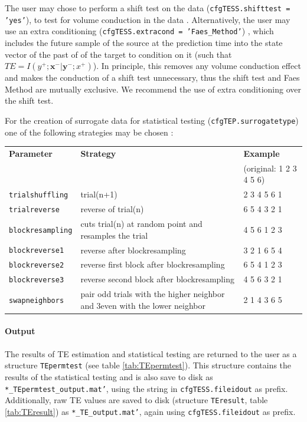 \documentclass[a4paper,10pt]{article}
\begin{document}
The user may chose to perform a shift test on the data (\texttt{cfgTESS.shifttest = 'yes'}), to test for volume conduction in the data \cite{lindner2011}. Alternatively, the user may use an extra conditioning (\texttt{cfgTESS.extracond = 'Faes\_Method'}) \cite{faes2013}, which includes the future sample of the source at the prediction time into the state vector of the past of of the target to condition on it (such that $TE = I\left(y^+;\mathbf{x}^-|\mathbf{y}^-; x^+\right)$). In principle, this removes any volume conduction effect and makes the conduction of a shift test unnecessary, thus the shift test and Faes Method are mutually exclusive. We recommend the use of extra conditioning over the shift test.

For the creation of surrogate data for statistical testing (\verb+cfgTEP.surrogatetype+) one of the following strategies may be chosen \cite{lindner2011}:

\begin{table}[H]
\begin{tabularx}{\textwidth}{lL{5cm}X} \toprule
\textbf{Parameter} & \textbf{Strategy} & \textbf{Example} \\
		   & 		       & (original: 1 2 3 4 5 6) \\ \midrule
\texttt{trialshuffling} &  trial(n+1) & 2 3 4 5 6 1 \\
\texttt{trialreverse}   &  reverse of trial(n) & 6 5 4 3 2 1 \\
\texttt{blockresampling} & cuts trial(n) at random point and resamples the trial &4 5 6 1 2 3 \\
\texttt{blockreverse1}   & reverse after blockresampling & 3 2 1 6 5 4 \\
\texttt{blockreverse2}   & reverse first block after blockresampling & 6 5 4 1 2 3\\
\texttt{blockreverse3}   & reverse second block after blockresampling & 4 5 6 3 2 1 \\
\texttt{swapneighbors}   & pair odd trials with the higher neighbor and 3even with the lower neighbor & 2 1 4 3 6 5\\ \bottomrule
\end{tabularx} \label{tab:surrogatetype}
\end{table}


\paragraph*{Output} The results of TE estimation and statistical testing are returned to the user as a structure \texttt{TEpermtest} (see table \ref{tab:TEpermtest}). This structure contains the results of the statistical testing and is also save to disk as \texttt{*\_TEpermtest\_output.mat'}, using the string in \texttt{cfgTESS.fileidout} as prefix. Additionally, raw TE values are saved to disk (structure \texttt{TEresult}, table \ref{tab:TEresult}) as \texttt{*\_TE\_output.mat'}, again using \texttt{cfgTESS.fileidout} as prefix.
\end{document}
